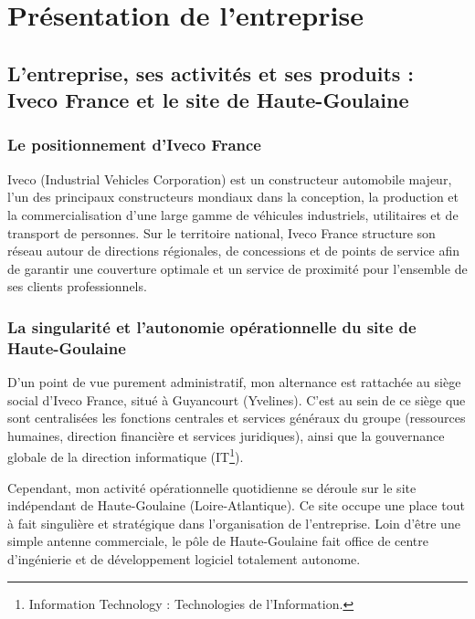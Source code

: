 \section*{Présentation de l'entreprise}

\subsection*{L'entreprise, ses activités et ses produits : Iveco France et le site de Haute-Goulaine}

\subsubsection*{Le positionnement d'Iveco France}

Iveco (Industrial Vehicles Corporation) est un constructeur automobile majeur, l'un des principaux constructeurs mondiaux dans la conception, la production et la commercialisation d'une large gamme de véhicules industriels, utilitaires et de transport de personnes. Sur le territoire national, Iveco France structure son réseau autour de directions régionales, de concessions et de points de service afin de garantir une couverture optimale et un service de proximité pour l'ensemble de ses clients professionnels.

\subsubsection*{La singularité et l'autonomie opérationnelle du site de Haute-Goulaine}

D'un point de vue purement administratif, mon alternance est rattachée au siège social d'Iveco France, situé à Guyancourt (Yvelines). C'est au sein de ce siège que sont centralisées les fonctions centrales et services généraux du groupe (ressources humaines, direction financière et services juridiques), ainsi que la gouvernance globale de la direction informatique (IT\footnote{Information Technology : Technologies de l'Information.}).

Cependant, mon activité opérationnelle quotidienne se déroule sur le site indépendant de Haute-Goulaine (Loire-Atlantique). Ce site occupe une place tout à fait singulière et stratégique dans l'organisation de l'entreprise. Loin d'être une simple antenne commerciale, le pôle de Haute-Goulaine fait office de centre d'ingénierie et de développement logiciel totalement autonome.

